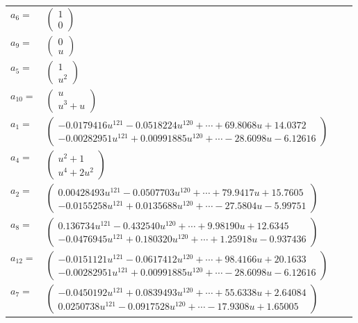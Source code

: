 \documentclass[1p]{elsarticle_modified}
\theoremstyle{definition}
\begin{document}
\begin{tabular}{m{7pt} m{180pt} m{7pt} m{180pt} }
\flushright $a_{6}=$&$\begin{pmatrix}1\\0\end{pmatrix}$ \\
\flushright $a_{9}=$&$\begin{pmatrix}0\\u\end{pmatrix}$ \\
\flushright $a_{5}=$&$\begin{pmatrix}1\\u^2\end{pmatrix}$ \\
\flushright $a_{10}=$&$\begin{pmatrix}u\\u^3+u\end{pmatrix}$ \\
\flushright $a_{1}=$&$\begin{pmatrix}-0.0179416 u^{121}-0.0518224 u^{120}+\cdots+69.8068 u+14.0372\\-0.00282951 u^{121}+0.00991885 u^{120}+\cdots-28.6098 u-6.12616\end{pmatrix}$ \\
\flushright $a_{4}=$&$\begin{pmatrix}u^2+1\\u^4+2 u^2\end{pmatrix}$ \\
\flushright $a_{2}=$&$\begin{pmatrix}0.00428493 u^{121}-0.0507703 u^{120}+\cdots+79.9417 u+15.7605\\-0.0155258 u^{121}+0.0135688 u^{120}+\cdots-27.5804 u-5.99751\end{pmatrix}$ \\
\flushright $a_{8}=$&$\begin{pmatrix}0.136734 u^{121}-0.432540 u^{120}+\cdots+9.98190 u+12.6345\\-0.0476945 u^{121}+0.180320 u^{120}+\cdots+1.25918 u-0.937436\end{pmatrix}$ \\
\flushright $a_{12}=$&$\begin{pmatrix}-0.0151121 u^{121}-0.0617412 u^{120}+\cdots+98.4166 u+20.1633\\-0.00282951 u^{121}+0.00991885 u^{120}+\cdots-28.6098 u-6.12616\end{pmatrix}$ \\
\flushright $a_{7}=$&$\begin{pmatrix}-0.0450192 u^{121}+0.0839493 u^{120}+\cdots+55.6338 u+2.64084\\0.0250738 u^{121}-0.0917528 u^{120}+\cdots-17.9308 u+1.65005\end{pmatrix}$ \\

\end{tabular}
\end{document}
